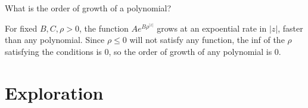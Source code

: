 \documentclass{homework}
\begin{document}
              \begin{problem}
                What is the order of growth of a polynomial?
                \end{problem}
                \begin{solution}
                For fixed $B, C, \rho>0$, the function $Ae^{B\rho^{|z|}}$ grows at an expoential rate in $|z|$, faster than any polynomial. Since $\rho\leq0$ will not satisfy any function, the inf of the $\rho$ satisfying the conditions is 0, so the order of growth of any polynomial is 0.
                \end{solution}
                \section{Exploration}
\end{document}
